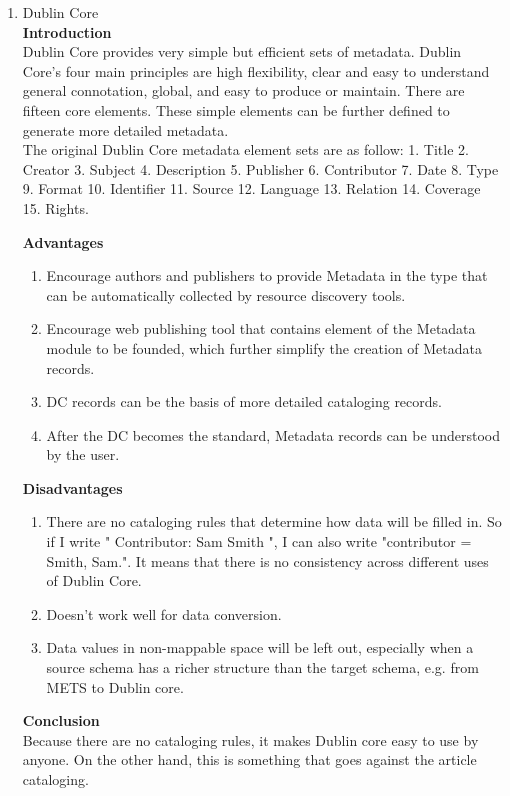 \begin{enumerate}
	\item Dublin Core\\
	{\bf Introduction}\\
	Dublin Core provides very simple but efficient sets of metadata.
	Dublin Core’s four main principles are high flexibility, 
	clear and easy to understand general connotation, global, and easy to produce or maintain.	There are fifteen core elements.
	 These simple elements can be further defined to generate more detailed metadata.\\
	The original Dublin Core metadata element sets are as follow:
	1. Title 2. Creator 3. Subject 4. Description 5. Publisher 
	6. Contributor 7. Date 8. Type 9. Format 10. Identifier
	11. Source 12. Language 13. Relation 14. Coverage 15. Rights.
	\cite{NISO2012}
	
	{\bf Advantages}
	\begin{enumerate}
		\item Encourage authors and publishers to provide Metadata in the type that can be automatically collected by resource discovery tools.
		\item Encourage web publishing tool that contains element of the Metadata module to be founded, which further simplify the creation of Metadata records.
		\item DC records can be the basis of more detailed cataloging records.
		\item After the DC becomes the standard, Metadata records can be understood by the user.
	\end{enumerate}	
		
	{\bf Disadvantages}
	\begin{enumerate}
		\item There are no cataloging rules that determine how data will be filled in. 
		So if I write " Contributor: Sam Smith ", I can also write "contributor = Smith, Sam.". 
			It means that there is no consistency across different uses of Dublin Core.
		\item Doesn't work well for data conversion.
		\item Data values in non-mappable space will be left out, especially when a source schema has a richer structure than the target schema, e.g. from METS to Dublin core.
	\end{enumerate}
	{\bf Conclusion}\\
	Because there are no cataloging rules, it makes Dublin core easy to use by anyone. 
	On the other hand, this is something that goes against the article cataloging.
		
\end{enumerate}

\newpage %







